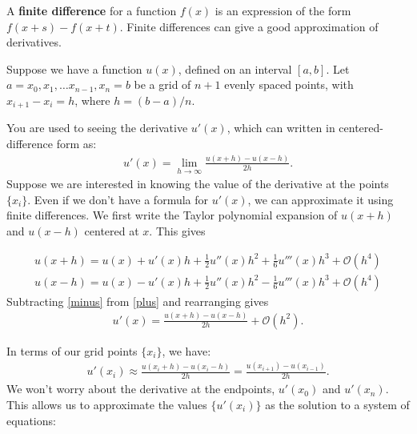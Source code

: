 \label{lab:finitedifference2}

A \textbf{finite difference} for a function $f(x)$ is an expression of the form $f(x+s)-f(x+t)$.
Finite differences can give a good approximation of derivatives.

Suppose we have a function $u(x)$, defined on an interval $[a,b]$.
Let $a = x_0, x_1, \ldots x_{n-1}, x_n=b$ be a grid of $n+1$ evenly spaced points, with $x_{i+1}-x_i = h$, where $h = (b-a)/n$.

You are used to seeing the derivative $u'(x)$, which can written in centered-difference form as:
\begin{align*}
u'(x)=\lim_{h\to\infty}\frac{u(x+h)-u(x-h)}{2h}.
 \end{align*}
Suppose we are interested in knowing the value of the derivative at the points $\{x_i\}$. Even if we don't have a formula for $u'(x)$, we can approximate it using finite differences.
We first write the Taylor polynomial expansion of $u(x+h)$ and $u(x-h)$ centered at $x$. This gives

\begin{align}
u(x+h)=u(x)+u'(x)h+\frac{1}{2}u''(x)h^2+\frac{1}{6}u'''(x)h^3+\mathcal{O}(h^4)\label{plus}\\
u(x-h)=u(x)-u'(x)h+\frac{1}{2}u''(x)h^2-\frac{1}{6}u'''(x)h^3+\mathcal{O}(h^4)\label{minus}
\end{align}
Subtracting \eqref{minus} from \eqref{plus} and rearranging gives
\begin{align*}
u'(x)=\frac{u(x+h)-u(x-h)}{2h}+\mathcal{O}(h^2).
\end{align*}

In terms of our grid points $\{x_i\}$, we have:
\begin{align*}
u'(x_i) \approx \frac{u(x_i+h)-u(x_i-h)}{2h}=\frac{u(x_{i+1})-u(x_{i-1})}{2h}.
\end{align*}
We won't worry about the derivative at the endpoints, $u'(x_0)$ and $u'(x_n)$.
This allows us to approximate the values $\{u'(x_i)\}$ as the solution to a system of equations:

